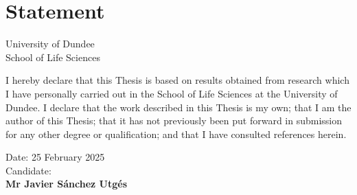 \chapter*{Statement}

\begin{center}
    \LARGE University of Dundee\\[1cm]
    \LARGE School of Life Sciences\\[2cm]
\end{center}

I hereby declare that this Thesis is based on results obtained from research which I have personally carried out in the School of Life Sciences at the University of Dundee. I declare that the work described in this Thesis is my own; that I am the author of this Thesis; that it has not previously been put forward in submission for any other degree or qualification; and that I have consulted references herein.

\vfill

\begin{flushright}
    Date: 25 February 2025\\[1cm]
    Candidate:  \underline{\hspace{6cm}}\\[1cm]
    \textbf{Mr Javier Sánchez Utgés}
\end{flushright}